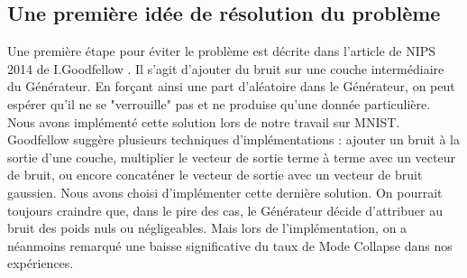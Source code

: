 	\subsection{Une première idée de résolution du problème}
		Une première étape pour éviter le problème est décrite dans l'article de NIPS 2014 de I.Goodfellow \cite{goodfellow_generative_2014}. Il s'agit d'ajouter du bruit sur une couche intermédiaire du Générateur. En forçant ainsi une part d'aléatoire dans le Générateur, on peut espérer qu'il ne se "verrouille" pas et ne produise qu'une donnée particulière. 
		Nous avons implémenté cette solution lors de notre travail sur MNIST. Goodfellow suggère plusieurs techniques d'implémentations : ajouter un bruit à la sortie d'une couche, multiplier le vecteur de sortie terme à terme avec un vecteur de bruit, ou encore concaténer le vecteur de sortie avec un vecteur de bruit gaussien. Nous avons choisi d'implémenter cette dernière solution. On pourrait toujours craindre que, dans le pire des cas, le Générateur décide d'attribuer au bruit des poids nuls ou négligeables. Mais lors de l'implémentation, on a néanmoins remarqué une baisse significative du taux de Mode Collapse dans nos expériences.

